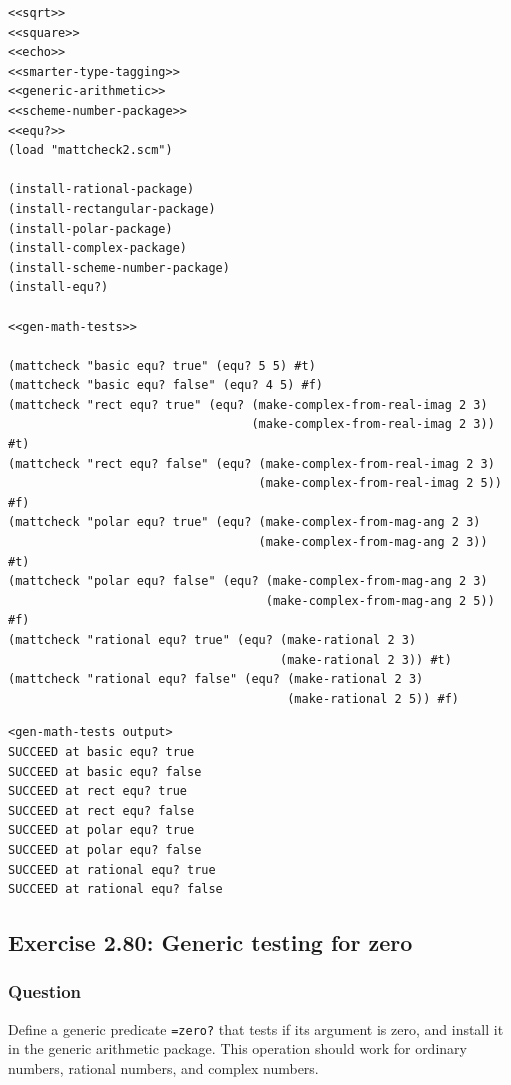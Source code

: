 \documentclass[final,fleqn,titlepage,twoside]{article}
\begin{document}
\begin{verbatim}
<<sqrt>>
<<square>>
<<echo>>
<<smarter-type-tagging>>
<<generic-arithmetic>>
<<scheme-number-package>>
<<equ?>>
(load "mattcheck2.scm")

(install-rational-package)
(install-rectangular-package)
(install-polar-package)
(install-complex-package)
(install-scheme-number-package)
(install-equ?)

<<gen-math-tests>>

(mattcheck "basic equ? true" (equ? 5 5) #t)
(mattcheck "basic equ? false" (equ? 4 5) #f)
(mattcheck "rect equ? true" (equ? (make-complex-from-real-imag 2 3)
                                  (make-complex-from-real-imag 2 3)) #t)
(mattcheck "rect equ? false" (equ? (make-complex-from-real-imag 2 3)
                                   (make-complex-from-real-imag 2 5)) #f)
(mattcheck "polar equ? true" (equ? (make-complex-from-mag-ang 2 3)
                                   (make-complex-from-mag-ang 2 3)) #t)
(mattcheck "polar equ? false" (equ? (make-complex-from-mag-ang 2 3)
                                    (make-complex-from-mag-ang 2 5)) #f)
(mattcheck "rational equ? true" (equ? (make-rational 2 3)
                                      (make-rational 2 3)) #t)
(mattcheck "rational equ? false" (equ? (make-rational 2 3)
                                       (make-rational 2 5)) #f)
\end{verbatim}

\begin{verbatim}
<gen-math-tests output>
SUCCEED at basic equ? true
SUCCEED at basic equ? false
SUCCEED at rect equ? true
SUCCEED at rect equ? false
SUCCEED at polar equ? true
SUCCEED at polar equ? false
SUCCEED at rational equ? true
SUCCEED at rational equ? false
\end{verbatim}

\subsection{Exercise 2.80: Generic testing for zero}
\label{sec:org061b96c}
\subsubsection{Question}
\label{sec:org8277f8e}
Define a generic predicate \texttt{=zero?} that tests if its argument is
zero, and install it in the generic arithmetic package. This operation should
work for ordinary numbers, rational numbers, and complex numbers.
\end{document}
